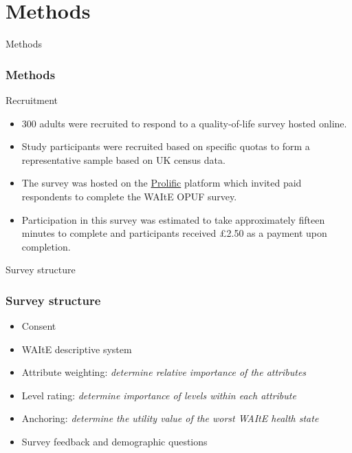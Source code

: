 \documentclass[t,compress,9pt,aspectratio=169]{beamer}
\begin{document}
\section{Methods}
\begin{frame}{Methods}
    \frametitle{Methods}
    \begin{block}{Recruitment}
        \begin{itemize}
        \item 300 adults were recruited to respond to a quality-of-life survey hosted online.
        \item Study participants were recruited based on specific quotas to form a representative sample based on UK census data.
        \item The survey was hosted on the \hyperlink{https://www.prolific.com}{Prolific} platform which invited paid respondents to complete the WAItE OPUF survey.
        \item Participation in this survey was estimated to take approximately fifteen minutes to complete and participants received £2.50 as a payment upon completion.
        \end{itemize}
    \end{block}
\end{frame}




\begin{frame}{Survey structure}
    \frametitle{Survey structure}
\begin{itemize}
    \item Consent
    \item WAItE descriptive system   
    \item Attribute weighting: \textit{determine relative importance of the attributes} 
    \item Level rating: \textit{determine importance of levels within each attribute}
    \item Anchoring: \textit{determine the utility value of the worst WAItE health state}
    \item Survey feedback and demographic questions
\end{itemize} 
\end{frame}
\end{document}
